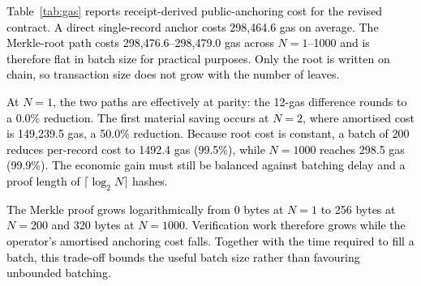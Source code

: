 \documentclass[final,5p,times,twocolumn]{elsarticle}
\begin{document}
\textcolor{black}{Table~\ref{tab:gas} reports receipt-derived public-anchoring cost for the revised contract. A direct single-record anchor costs 298{,}464.6 gas on average. The Merkle-root path costs 298{,}476.6--298{,}479.0 gas across $N=1$--1000 and is therefore flat in batch size for practical purposes. Only the root is written on chain, so transaction size does not grow with the number of leaves.}

\textcolor{black}{At $N=1$, the two paths are effectively at parity: the 12-gas difference rounds to a 0.0\% reduction. The first material saving occurs at $N=2$, where amortised cost is 149{,}239.5 gas, a 50.0\% reduction. Because root cost is constant, a batch of 200 reduces per-record cost to 1492.4 gas (99.5\%), while $N=1000$ reaches 298.5 gas (99.9\%). The economic gain must still be balanced against batching delay and a proof length of $\lceil\log_2N\rceil$ hashes.}

\textcolor{black}{The Merkle proof grows logarithmically from 0 bytes at $N=1$ to 256 bytes at $N=200$ and 320 bytes at $N=1000$. Verification work therefore grows while the operator's amortised anchoring cost falls. Together with the time required to fill a batch, this trade-off bounds the useful batch size rather than favouring unbounded batching.}
\end{document}
